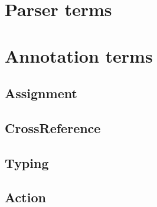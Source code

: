 \section{Parser terms}

\section{Annotation terms}

\subsection{Assignment}

\subsection{CrossReference}

\subsection{Typing}

\subsection{Action}
